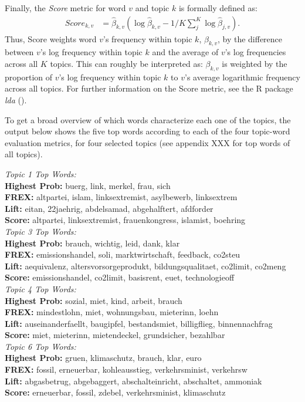 Finally, the \textit{Score} metric for word $v$ and topic $k$ is formally defined as:
\begin{align*}
Score_{k,v} &= \hat{\beta}_{k,v}(\log\hat{\beta}_{k,v} - 1/K\sum_{j}^{K}\log\hat{\beta}_{j,v}).
\end{align*}
Thus, Score weights word $v$'s frequency within topic $k$, $\beta_{k,v}$, by the difference between $v$'s log frequency within topic $k$ and the average of $v$'s log frequencies across all $K$ topics. This can roughly be interpreted as: $\beta_{k,v}$ is weighted by the proportion of $v$'s log frequency within topic $k$ to $v$'s average logarithmic frequency across all topics. For further information on the Score metric, see the R package \textit{lda} (\cite{chang2010package}).

To get a broad overview of which words characterize each one of the topics, the output below shows the five top words according to each of the four topic-word evaluation metrics, for four selected topics (see appendix XXX for top words of all topics).

\vspace{0.5cm}
\noindent
\textit{Topic 1 Top Words:}\\
 	 \textbf{Highest Prob:} buerg, link, merkel, frau, sich \\
 	 \textbf{FREX:} altpartei, islam, linksextremist, asylbewerb, linksextrem \\
 	 \textbf{Lift:} eitan, 22jaehrig, abdelsamad, abgehalftert, afdforder \\
 	 \textbf{Score:} altpartei, linksextremist, frauenkongress, islamist, boehring \\
\textit{Topic 3 Top Words:}\\
 	 \textbf{Highest Prob:} brauch, wichtig, leid, dank, klar \\
 	 \textbf{FREX:} emissionshandel, soli, marktwirtschaft, feedback, co2steu \\
 	 \textbf{Lift:} aequivalenz, altersvorsorgeprodukt, bildungsqualitaet, co2limit, co2meng \\
 	 \textbf{Score:} emissionshandel, co2limit, basisrent, euet, technologieoff \\
\textit{Topic 4 Top Words:}\\
 	 \textbf{Highest Prob:} sozial, miet, kind, arbeit, brauch \\
 	 \textbf{FREX:} mindestlohn, miet, wohnungsbau, mieterinn, loehn \\
 	 \textbf{Lift:} auseinanderfaellt, baugipfel, bestandsmiet, billigflieg, binnennachfrag \\
 	 \textbf{Score:} miet, mieterinn, mietendeckel, grundsicher, bezahlbar \\
\textit{Topic 6 Top Words:}\\
 	 \textbf{Highest Prob:} gruen, klimaschutz, brauch, klar, euro \\
 	 \textbf{FREX:} fossil, erneuerbar, kohleausstieg, verkehrsminist, verkehrsw \\
 	 \textbf{Lift:} abgasbetrug, abgebaggert, abschalteinricht, abschaltet, ammoniak \\ 
 	 \textbf{Score:} erneuerbar, fossil, zdebel, verkehrsminist, klimaschutz \\

